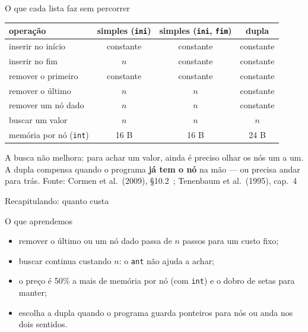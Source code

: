 \documentclass[aspectratio=169]{beamer}
\newcommand{\fonte}[1]{\vfill\hfill{\scriptsize\textcolor{UFSGray}{Fonte: #1}}}
\begin{document}
\begin{frame}{O que cada lista faz sem percorrer}
  \begin{center}
  \small
  \begin{tabular}{@{}lccc@{}}
    \toprule
    operação & simples (\texttt{ini}) & simples (\texttt{ini}, \texttt{fim}) & dupla\\
    \midrule
    inserir no início         & constante & constante & constante\\
    inserir no fim            & $n$ & constante & constante\\
    remover o primeiro        & constante & constante & constante\\
    remover o último          & $n$ & $n$ & constante\\
    remover um nó dado        & $n$ & $n$ & constante\\
    buscar um valor           & $n$ & $n$ & $n$\\
    memória por nó (\texttt{int}) & 16 B & 16 B & 24 B\\
    \bottomrule
  \end{tabular}
  \end{center}
  \small A busca não melhora: para achar um valor, ainda é preciso olhar os
  nós um a um. A dupla compensa quando o programa \textbf{já tem o nó} na
  mão --- ou precisa andar para trás.
  \fonte{Cormen et al.\ (2009), §10.2~\cite{cormen2009introduction};
    Tenenbaum et al.\ (1995), cap.~4~\cite{tenenbaum1995estruturas}}
\end{frame}

\begin{frame}{Recapitulando: quanto custa}
  \begin{block}{O que aprendemos}
    \begin{itemize}
      \item remover o último ou um nó dado passa de $n$ passos para um
        custo fixo;
      \item buscar continua custando $n$: o \texttt{ant} não ajuda a achar;
      \item o preço é 50\% a mais de memória por nó (com \texttt{int}) e
        o dobro de setas para manter;
      \item escolha a dupla quando o programa guarda ponteiros para nós ou
        anda nos dois sentidos.
    \end{itemize}
  \end{block}
\end{frame}

\end{document}
